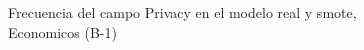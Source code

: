 \begin{figure}[H]
    \centering
    
    \caption{Frecuencia del campo Privacy en el modelo real y smote, Economicos (B-1)}
    \label{frecuency-Privacy-smote-enc}
\end{figure}